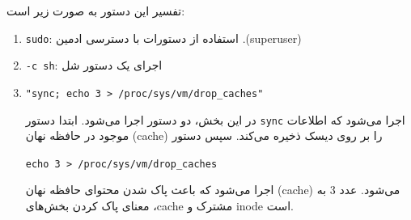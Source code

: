 \begin{qsolve}
تفسیر این دستور به صورت زیر است:
\begin{enumerate}
	\item \texttt{sudo}: استفاده از دستورات با دسترسی ادمین .(superuser)
	\item \texttt{-c sh}: اجرای یک دستور شل
	\item \begin{latin}
		\texttt{"sync; echo 3 > /proc/sys/vm/drop\_caches"} 
	\end{latin}
	
	در این بخش، دو دستور اجرا می‌شود. ابتدا دستور \texttt{sync} اجرا می‌شود که اطلاعات موجود در حافظه نهان (cache) را بر روی دیسک ذخیره می‌کند. سپس دستور
	
	 \begin{latin}
	 	\texttt{echo 3 > /proc/sys/vm/drop\_caches}
	 \end{latin}
	  اجرا می‌شود که باعث پاک شدن محتوای حافظه نهان (cache) می‌شود. عدد 3 به معنای پاک کردن بخش‌های ،cache مشترک و inode است.
\end{enumerate}
	
\end{qsolve}


